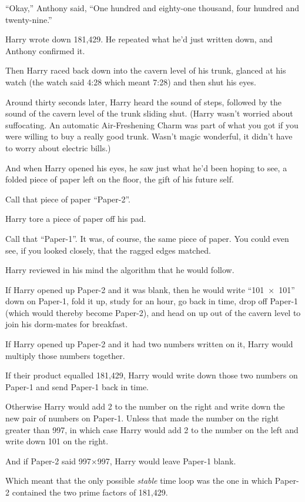 “Okay,” Anthony said, “One hundred and eighty-one thousand, four hundred and twenty-nine.”

Harry wrote down 181,429. He repeated what he’d just written down, and Anthony confirmed it.

Then Harry raced back down into the cavern level of his trunk, glanced at his watch (the watch said 4:28 which meant 7:28) and then shut his eyes.

Around thirty seconds later, Harry heard the sound of steps, followed by the sound of the cavern level of the trunk sliding shut. (Harry wasn’t worried about suffocating. An automatic Air-Freshening Charm was part of what you got if you were willing to buy a really good trunk. Wasn’t magic wonderful, it didn’t have to worry about electric bills.)

And when Harry opened his eyes, he saw just what he’d been hoping to see, a folded piece of paper left on the floor, the gift of his future self.

Call that piece of paper “Paper-2”.

Harry tore a piece of paper off his pad.

Call that “Paper-1”. It was, of course, the same piece of paper. You could even see, if you looked closely, that the ragged edges matched.

Harry reviewed in his mind the algorithm that he would follow.

If Harry opened up Paper-2 and it was blank, then he would write “101~$\times$~101” down on Paper-1, fold it up, study for an hour, go back in time, drop off Paper-1 (which would thereby become Paper-2), and head on up out of the cavern level to join his dorm-mates for breakfast.

If Harry opened up Paper-2 and it had two numbers written on it, Harry would multiply those numbers together.

If their product equalled 181,429, Harry would write down those two numbers on Paper-1 and send Paper-1 back in time.

Otherwise Harry would add 2 to the number on the right and write down the new pair of numbers on Paper-1. Unless that made the number on the right greater than 997, in which case Harry would add 2 to the number on the left and write down 101 on the right.

And if Paper-2 said 997$\times$997, Harry would leave Paper-1 blank.

Which meant that the only possible \emph{stable} time loop was the one in which Paper-2 contained the two prime factors of 181,429.

